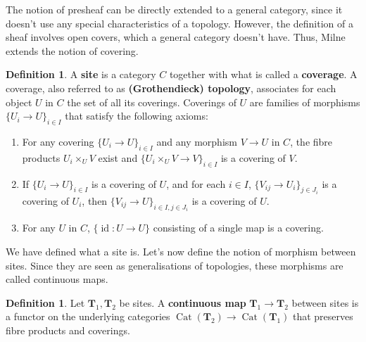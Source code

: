 \documentclass{report}
\DeclareMathOperator{\id}{id}
\DeclareMathOperator{\Cat}{Cat}
\theoremstyle{definition}
\newtheorem{definition}[theorem]{Definition}
\begin{document}
The notion of presheaf can be directly extended to a general category, since it doesn't use any special characteristics of a topology. However, the definition of a sheaf involves open covers, which a general category doesn't have. Thus, Milne \cite[Section~I.5]{milne2013lectures} extends the notion of covering.

\begin{definition}
\label{Def:site}
A \textbf{site} is a category $C$ together with what is called a \textbf{coverage}. A coverage, also referred to as \textbf{(Grothendieck) topology}, associates for each object $U$ in $C$ the set of all its coverings. Coverings of $U$ are families of morphisms $\{U_i\rightarrow U\}_{i\in I}$ that satisfy the following axioms:
\begin{enumerate}
\item\label{Def:site:coverage_product} For any covering $\{U_i\rightarrow U\}_{i\in I}$ and any morphism $V\rightarrow U$ in $C$, the fibre products $U_i\times_UV$ exist and $\{U_i\times_UV\rightarrow V\}_{i\in I}$ is a covering of $V$.

\item If $\{U_i\rightarrow U\}_{i\in I}$ is a covering of $U$, and for each $i\in I$, $\{V_{ij}\rightarrow U_i\}_{j\in J_i}$ is a covering of $U_i$, then $\{V_{ij}\rightarrow U\}_{i\in I,j\in J_i}$ is a covering of $U$.

\item For any $U$ in $C$, $\{\id:U\rightarrow U\}$ consisting of a single map is a covering.
\end{enumerate}
\end{definition}

We have defined what a site is. Let's now define the notion of morphism between sites. Since they are seen as generalisations of topologies, these morphisms are called continuous maps.

\begin{definition}
Let $\boldsymbol{T}_1,\boldsymbol{T}_2$ be sites. A \textbf{continuous map} $\boldsymbol{T}_1\rightarrow\boldsymbol{T}_2$ between sites is a functor on the underlying categories $\Cat(\boldsymbol{T}_2)\rightarrow\Cat(\boldsymbol{T}_1)$ that preserves fibre products and coverings.
\end{definition}
\end{document}
